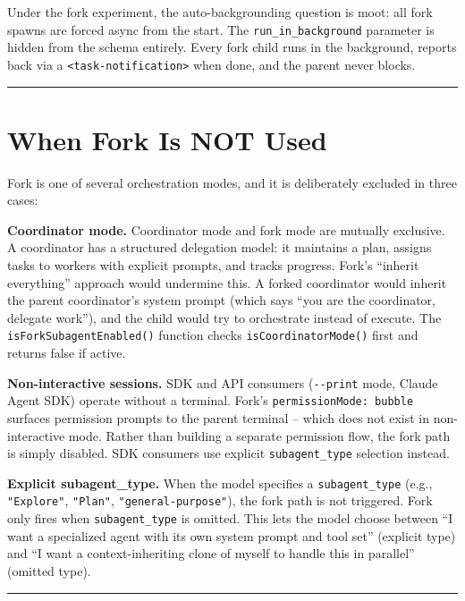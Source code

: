 \documentclass[
  english,
  11pt,
  letterpaper,
]{book}
\begin{document}
Under the fork experiment, the auto-backgrounding question is moot: all
fork spawns are forced async from the start. The
\texttt{run\_in\_background} parameter is hidden from the schema
entirely. Every fork child runs in the background, reports back via a
\texttt{\textless{}task-notification\textgreater{}} when done, and the
parent never blocks.

\begin{center}\rule{0.5\linewidth}{0.5pt}\end{center}

\section{When Fork Is NOT Used}\label{when-fork-is-not-used}

Fork is one of several orchestration modes, and it is deliberately
excluded in three cases:

\textbf{Coordinator mode.} Coordinator mode and fork mode are mutually
exclusive. A coordinator has a structured delegation model: it maintains
a plan, assigns tasks to workers with explicit prompts, and tracks
progress. Fork's ``inherit everything'' approach would undermine this. A
forked coordinator would inherit the parent coordinator's system prompt
(which says ``you are the coordinator, delegate work''), and the child
would try to orchestrate instead of execute. The
\texttt{isForkSubagentEnabled()} function checks
\texttt{isCoordinatorMode()} first and returns false if active.

\textbf{Non-interactive sessions.} SDK and API consumers
(\texttt{-\/-print} mode, Claude Agent SDK) operate without a terminal.
Fork's
\texttt{permissionMode:\ \textquotesingle{}bubble\textquotesingle{}}
surfaces permission prompts to the parent terminal -- which does not
exist in non-interactive mode. Rather than building a separate
permission flow, the fork path is simply disabled. SDK consumers use
explicit \texttt{subagent\_type} selection instead.

\textbf{Explicit subagent\_type.} When the model specifies a
\texttt{subagent\_type} (e.g., \texttt{"Explore"}, \texttt{"Plan"},
\texttt{"general-purpose"}), the fork path is not triggered. Fork only
fires when \texttt{subagent\_type} is omitted. This lets the model
choose between ``I want a specialized agent with its own system prompt
and tool set'' (explicit type) and ``I want a context-inheriting clone
of myself to handle this in parallel'' (omitted type).

\begin{center}\rule{0.5\linewidth}{0.5pt}\end{center}
\end{document}
